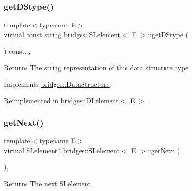 \subsubsection{\texorpdfstring{get\+D\+Stype()}{getDStype()}}
{\footnotesize\ttfamily template$<$typename E$>$ \\
virtual const string \hyperlink{classbridges_1_1_s_lelement}{bridges\+::\+S\+Lelement}$<$ E $>$\+::get\+D\+Stype (\begin{DoxyParamCaption}{ }\end{DoxyParamCaption}) const\hspace{0.3cm}{\ttfamily [inline]}, {\ttfamily [override]}, {\ttfamily [virtual]}}

\begin{DoxyReturn}{Returns}
The string representation of this data structure type 
\end{DoxyReturn}


Implements \hyperlink{classbridges_1_1_data_structure_a957a63b106e340bc753620c650632bdc}{bridges\+::\+Data\+Structure}.



Reimplemented in \hyperlink{classbridges_1_1_d_lelement_a109be7aba8bd3d0450859938b5d3144c}{bridges\+::\+D\+Lelement$<$ E $>$}.

\hypertarget{classbridges_1_1_s_lelement_a5bd74108a9aa49339378bf62cdbb19ca}{}\label{classbridges_1_1_s_lelement_a5bd74108a9aa49339378bf62cdbb19ca} 
\subsubsection{\texorpdfstring{get\+Next()}{getNext()}\hspace{0.1cm}{\footnotesize\ttfamily [1/2]}}
{\footnotesize\ttfamily template$<$typename E$>$ \\
virtual \hyperlink{classbridges_1_1_s_lelement}{S\+Lelement}$\ast$ \hyperlink{classbridges_1_1_s_lelement}{bridges\+::\+S\+Lelement}$<$ E $>$\+::get\+Next (\begin{DoxyParamCaption}{ }\end{DoxyParamCaption})\hspace{0.3cm}{\ttfamily [inline]}, {\ttfamily [virtual]}}

\begin{DoxyReturn}{Returns}
The next \hyperlink{classbridges_1_1_s_lelement}{S\+Lelement} 
\end{DoxyReturn}


